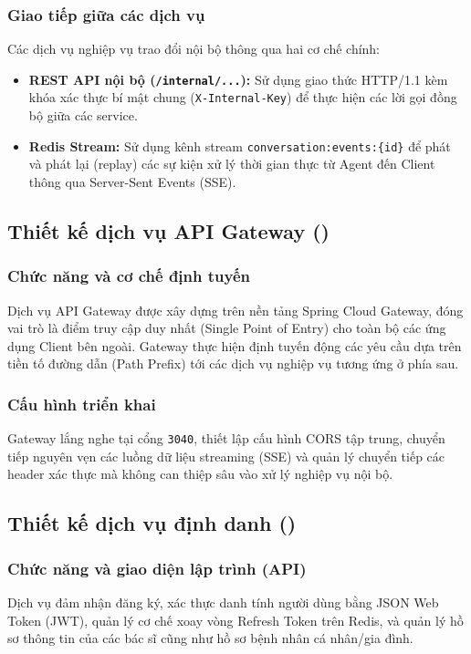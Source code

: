 \subsubsection{Giao tiếp giữa các dịch vụ}
Các dịch vụ nghiệp vụ trao đổi nội bộ thông qua hai cơ chế chính:
\begin{itemize}
  \item \textbf{REST API nội bộ (\texttt{/internal/...}):} Sử dụng giao thức HTTP/1.1 kèm khóa xác thực bí mật chung (\texttt{X-Internal-Key}) để thực hiện các lời gọi đồng bộ giữa các service.
  \item \textbf{Redis Stream:} Sử dụng kênh stream \texttt{conversation:events:\{id\}} để phát và phát lại (replay) các sự kiện xử lý thời gian thực từ Agent đến Client thông qua Server-Sent Events (SSE).
\end{itemize}

\subsection{Thiết kế dịch vụ API Gateway ()}

\subsubsection{Chức năng và cơ chế định tuyến}
Dịch vụ API Gateway được xây dựng trên nền tảng Spring Cloud Gateway, đóng vai trò là điểm truy cập duy nhất (Single Point of Entry) cho toàn bộ các ứng dụng Client bên ngoài. Gateway thực hiện định tuyến động các yêu cầu dựa trên tiền tố đường dẫn (Path Prefix) tới các dịch vụ nghiệp vụ tương ứng ở phía sau.

\subsubsection{Cấu hình triển khai}
Gateway lắng nghe tại cổng \texttt{3040}, thiết lập cấu hình CORS tập trung, chuyển tiếp nguyên vẹn các luồng dữ liệu streaming (SSE) và quản lý chuyển tiếp các header xác thực mà không can thiệp sâu vào xử lý nghiệp vụ nội bộ.

\subsection{Thiết kế dịch vụ định danh ()}

\subsubsection{Chức năng và giao diện lập trình (API)}
Dịch vụ đảm nhận đăng ký, xác thực danh tính người dùng bằng JSON Web Token (JWT), quản lý cơ chế xoay vòng Refresh Token trên Redis, và quản lý hồ sơ thông tin của các bác sĩ cũng như hồ sơ bệnh nhân cá nhân/gia đình.

